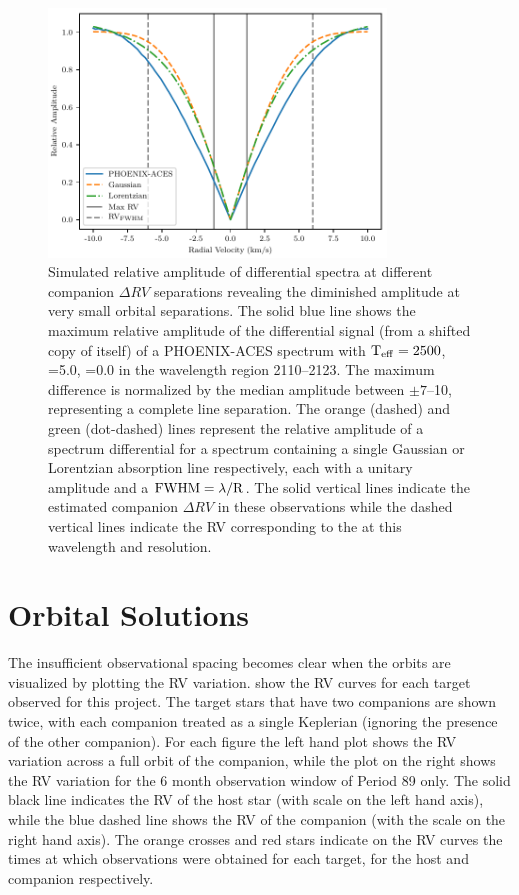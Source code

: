 \begin{figure}
    \centering
    \includegraphics[width=0.8\textwidth]{figures/direct-recovery/rv_diff_final.pdf}
    \caption[Simulated relative amplitude of differntial spectrum.]{Simulated relative amplitude of differential spectra at different companion \(\Delta RV\) separations revealing the diminished amplitude at very small orbital separations.
    The solid blue line shows the maximum relative amplitude of the differential signal (from a shifted copy of itself) of a {PHOENIX-ACES} spectrum with \(\textrm{T}_{\mathrm{eff}}{}=2500\)\K{}, \logg{}=5.0, \feh{}=0.0 in the wavelength region 2110--2123\nm{}.
    The maximum difference is normalized by the median amplitude between \(\pm7\)--10\kmps{}, representing a complete line separation.
    The orange (dashed) and green (dot-dashed) lines represent the relative amplitude of a spectrum differential for a spectrum containing a single Gaussian or Lorentzian absorption line respectively, each with a unitary amplitude and a \(\rm {\textrm{FWHM}} = \lambda / R\).
    The solid vertical lines indicate the estimated companion \(\Delta {RV}\) in these observations while the dashed vertical lines indicate the {RV} corresponding to the {\fwhm} at this wavelength and resolution.}
    \label{fig:diff_amp}
\end{figure}


\section{Orbital Solutions}
\label{sec:orbtial_diagrams}
The insufficient observational spacing becomes clear when the orbits are visualized by plotting the {RV} variation.
 show the {RV} curves for each target observed for this project.
The target stars that have two companions are shown twice, with each companion treated as a single Keplerian (ignoring the presence of the other companion).
For each figure the left hand plot shows the {RV} variation across a full orbit of the companion, while the plot on the right shows the {RV} variation for the 6 month observation window of Period 89 only.
The solid black line indicates the {RV} of the host star (with scale on the left hand axis), while the blue dashed line shows the {RV} of the companion (with the scale on the right hand axis).
The orange crosses and red stars indicate on the {RV} curves the times at which observations were obtained for each target, for the host and companion respectively.

